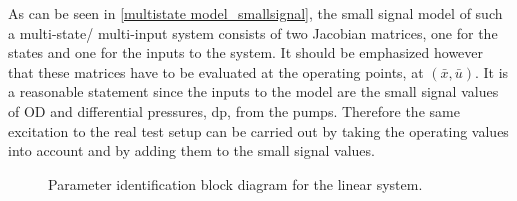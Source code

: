 As can be seen in \eqref{multistate model_smallsignal}, the small signal model of such a multi-state/ multi-input system consists of two Jacobian matrices, one for the states and one for the inputs to the system. It should be emphasized however that these matrices have to be evaluated at the operating points, at $(\bar{x}, \bar{u})$. It is a reasonable statement since the inputs to the model are the small signal values of OD and differential pressures, dp, from the pumps. Therefore the same excitation to the real test setup can be carried out by taking the operating values into account and by adding them to the small signal values. 

\begin{figure}[H]
\centering
 
\caption{Parameter identification block diagram for the linear system. }
\label{fig:parame_block_lin}
\end{figure}

